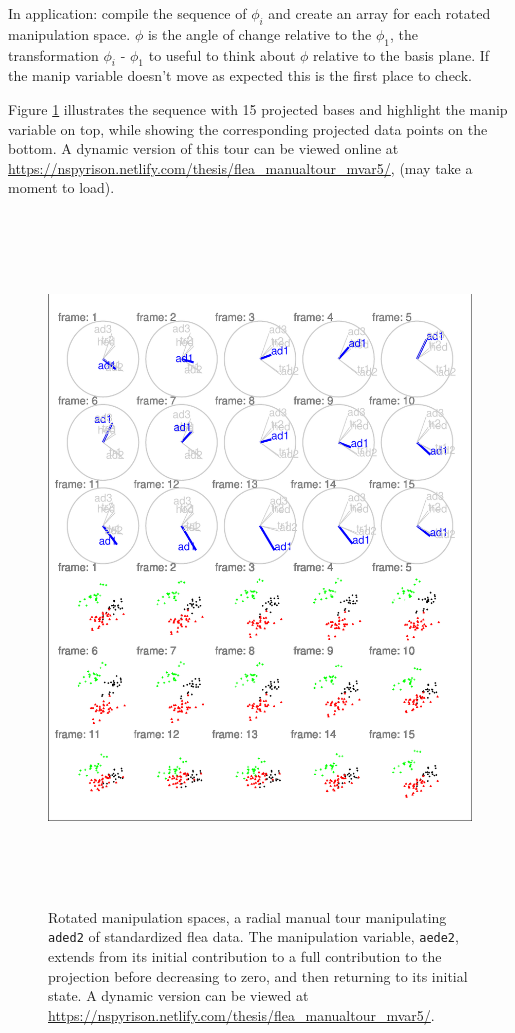 \documentclass{monashthesis}
\begin{document}
In application: compile the sequence of \(\phi_i\) and create an array
for each rotated manipulation space. \(\phi\) is the angle of change
relative to the \(\phi_1\), the transformation \(\phi_i\) - \(\phi_1\)
to useful to think about \(\phi\) relative to the basis plane. If the
manip variable doesn't move as expected this is the first place to
check.

Figure \ref{fig:step3} illustrates the sequence with 15 projected bases
and highlight the manip variable on top, while showing the corresponding
projected data points on the bottom. A dynamic version of this tour can
be viewed online at
\url{https://nspyrison.netlify.com/thesis/flea_manualtour_mvar5/}, (may
take a moment to load).








\begin{figure}

{\centering \includegraphics[width=6in,height=7.2in]{thesis_files/figure-latex/step3-1} 

}

\caption{Rotated manipulation spaces, a radial manual tour
manipulating \texttt{aded2} of standardized flea data. The manipulation
variable, \texttt{aede2}, extends from its initial contribution to a
full contribution to the projection before decreasing to zero, and then
returning to its initial state. A dynamic version can be viewed at
\url{https://nspyrison.netlify.com/thesis/flea_manualtour_mvar5/}.}\label{fig:step3}
\end{figure}
\end{document}

